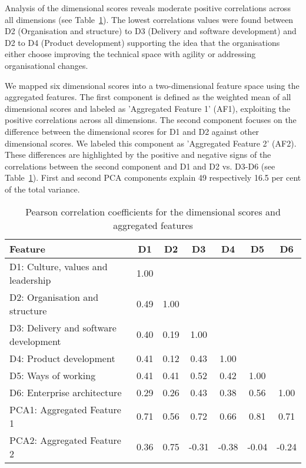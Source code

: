 \documentclass{article}
\newcommand{\myremark}[1]{{#1}}
\newcommand{\ikremark}[1]{\myremark{\color{blue} [Ivan: #1]}}
\begin{document}
Analysis of the dimensional scores reveals moderate positive correlations across all dimensions (see Table~\ref{tab:corr}). The lowest correlations values were found between D2 (Organisation and structure) to D3 (Delivery and software development) and D2 to D4 (Product development) supporting the idea that the organisations either choose improving the technical space with agility or addressing organisational changes.


We mapped six dimensional scores into a two-dimensional feature space using the aggregated features. The first component is defined as the weighted mean of all dimensional scores and labeled as 'Aggregated Feature 1' (AF1), exploiting the positive correlations across all dimensions. The second component focuses on the difference between the dimensional scores for D1 and D2 against other dimensional scores. We labeled this component as 'Aggregated Feature 2' (AF2).
These differences are highlighted by the positive and negative signs of the correlations between the second component and D1 and D2 vs. D3-D6 (see Table~\ref{tab:corr}). First and second PCA components explain 49 respectively 16.5 per cent of the total variance.
\begin{table}[hbt]
   \small
 \caption{Pearson correlation coefficients for the dimensional scores and aggregated features}
  \centering
  \begin{tabular}{lcccccc}
  Feature & D1 & D2 &D3 &D4 &D5 &D6  \\
   \midrule
    D1: Culture, values and leadership & 1.00& & & & & \\
    D2: Organisation and structure & 0.49& 1.00&  & & &  \\
    D3: Delivery and software development  & 0.40 & 0.19 & 1.00& & &  \\
    D4: Product development & 0.41& 0.12 & 0.43& 1.00& & \\
    D5: Ways of working  & 0.41& 0.41& 0.52& 0.42& 1.00& \\
    D6: Enterprise architecture & 0.29& 0.26& 0.43& 0.38& 0.56& 1.00\\
    \midrule
    PCA1: Aggregated Feature 1  & 0.71& 0.56& 0.72& 0.66& 0.81& 0.71 \\
    PCA2: Aggregated Feature 2  & 0.36& 0.75& -0.31& -0.38& -0.04& -0.24\\
\end{tabular}
  \label{tab:corr}
 \end{table}
\end{document}

